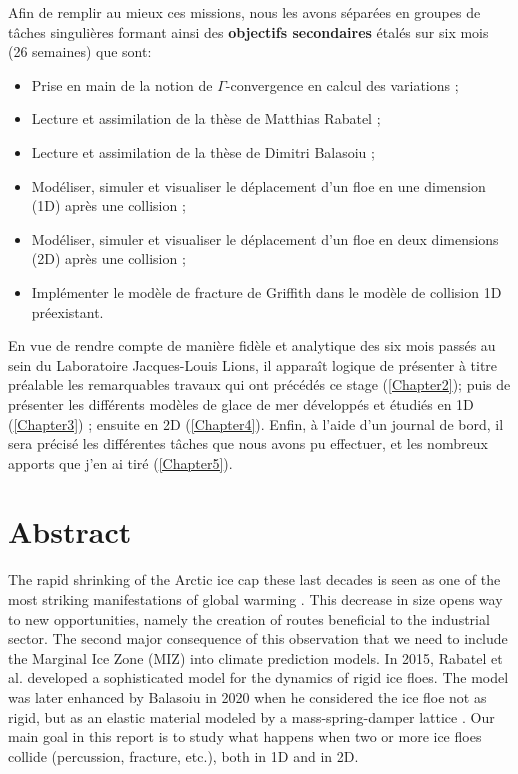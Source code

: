 \noindent Afin de remplir au mieux ces missions, nous les avons séparées en groupes de tâches singulières formant ainsi des \textbf{objectifs secondaires} étalés sur six mois (26 semaines) que sont:   

\begin{itemize}
    \item Prise en main de la notion de $\Gamma$-convergence en calcul des variations ;
    \item Lecture et assimilation de la thèse de Matthias Rabatel \parencite{rabatel2015thesis} ;
    \item Lecture et assimilation de la thèse de Dimitri Balasoiu \parencite{balasoiu2020halthesis} ;
    \item Modéliser, simuler et visualiser le déplacement d'un floe en une dimension (1D) après une collision ;
    \item Modéliser, simuler et visualiser le déplacement d'un floe en deux dimensions (2D) après une collision ;
    \item Implémenter le modèle de fracture de Griffith dans le modèle de collision 1D préexistant.
\end{itemize}



En vue de rendre compte de manière fidèle et analytique des six mois passés au sein du Laboratoire Jacques-Louis Lions, il apparaît logique de présenter à titre préalable les remarquables travaux qui ont précédés ce stage (\cref{Chapter2}); puis de présenter les différents modèles de glace de mer développés et étudiés en 1D (\cref{Chapter3}) ; ensuite en 2D (\cref{Chapter4}). Enfin, à l'aide d'un journal de bord, il sera précisé les différentes tâches que nous avons pu effectuer, et les nombreux apports que j'en ai tiré (\cref{Chapter5}). 









\section{Abstract}


The rapid shrinking of the Arctic ice cap these last decades is seen as one of the most striking manifestations of global warming \parencite{stroeve2012trends}. This decrease in size opens way to new opportunities, namely the creation of routes beneficial to the industrial sector. The second major consequence of this observation that we need to include the Marginal Ice Zone (MIZ) into climate prediction models. In 2015, Rabatel et al. \parencite{rabatel2015dynamics,rabatel2015thesis} developed a sophisticated model for the dynamics of rigid ice floes. The model was later enhanced by Balasoiu in 2020 when he considered the ice floe not as rigid, but as an elastic material modeled by a mass-spring-damper lattice \parencite{balasoiu2020halthesis}. Our main goal in this report is to study what happens when two or more ice floes collide (percussion, fracture, etc.), both in 1D and in 2D.
